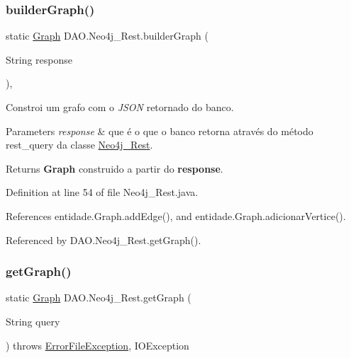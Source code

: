 \subsubsection{\texorpdfstring{builder\+Graph()}{builderGraph()}}
{\footnotesize\ttfamily static \hyperlink{classentidade_1_1Graph}{Graph} D\+A\+O.\+Neo4j\+\_\+\+Rest.\+builder\+Graph (\begin{DoxyParamCaption}\item[{String}]{response }\end{DoxyParamCaption})\hspace{0.3cm}{\ttfamily [static]}, {\ttfamily [private]}}

Constroi um grafo com o {\itshape J\+S\+ON} retornado do banco. 
\begin{DoxyParams}{Parameters}
{\em response} & que é o que o banco retorna através do método rest\+\_\+query da classe \hyperlink{classDAO_1_1Neo4j__Rest}{Neo4j\+\_\+\+Rest}. \\
\hline
\end{DoxyParams}
\begin{DoxyReturn}{Returns}
{\bfseries Graph} construido a partir do {\bfseries response}. 
\end{DoxyReturn}


Definition at line 54 of file Neo4j\+\_\+\+Rest.\+java.



References entidade.\+Graph.\+add\+Edge(), and entidade.\+Graph.\+adicionar\+Vertice().



Referenced by D\+A\+O.\+Neo4j\+\_\+\+Rest.\+get\+Graph().

\hypertarget{classDAO_1_1Neo4j__Rest_ad77ecb3b275019e3186dbdd34dcedc6c}{}\label{classDAO_1_1Neo4j__Rest_ad77ecb3b275019e3186dbdd34dcedc6c} 
\subsubsection{\texorpdfstring{get\+Graph()}{getGraph()}}
{\footnotesize\ttfamily static \hyperlink{classentidade_1_1Graph}{Graph} D\+A\+O.\+Neo4j\+\_\+\+Rest.\+get\+Graph (\begin{DoxyParamCaption}\item[{String}]{query }\end{DoxyParamCaption}) throws \hyperlink{classexcessao_1_1ErrorFileException}{Error\+File\+Exception}, I\+O\+Exception\hspace{0.3cm}{\ttfamily [static]}}


